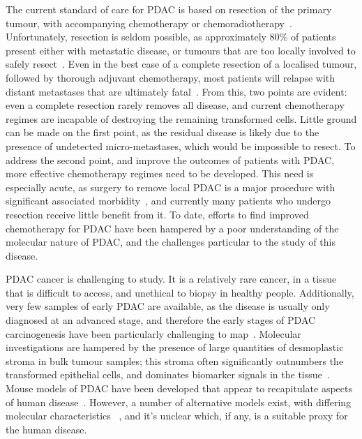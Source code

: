 \documentclass[thesis.tex]{subfiles}
\begin{document}
The current standard of care for \gls{PDAC} is based on resection of the primary tumour, with accompanying chemotherapy or chemoradiotherapy~\cite{Editors2015}.  Unfortunately, resection is seldom possible, as approximately $80\%$ of patients present either with metastatic disease, or tumours that are too locally involved to safely resect~\cite{Ryan2014}.  Even in the best case of a complete resection of a localised tumour, followed by thorough adjuvant chemotherapy, most patients will relapse with distant metastases that are ultimately fatal~\cite{Barugola2007}.  From this, two points are evident: even a complete resection rarely removes all disease, and current chemotherapy regimes are incapable of destroying the remaining transformed cells.  Little ground can be made on the first point, as the residual disease is likely due to the presence of undetected micro-metastases, which would be impossible to resect.  To address the second point, and improve the outcomes of patients with \gls{PDAC}, more effective chemotherapy regimes need to be developed.  This need is especially acute, as surgery to remove local \gls{PDAC} is a major procedure with significant associated morbidity~\cite{Ho2005}, and currently many patients who undergo resection receive little benefit from it.  To date, efforts to find improved chemotherapy for \gls{PDAC} have been hampered by a poor understanding of the molecular nature of \gls{PDAC}, and the challenges particular to the study of this disease.

\gls{PDAC} cancer is challenging to study.  It is a relatively rare cancer, in a tissue that is difficult to access, and unethical to biopsy in healthy people.  Additionally, very few samples of early \gls{PDAC} are available, as the disease is usually only diagnosed at an advanced stage, and therefore the early stages of \gls{PDAC} carcinogenesis have been particularly challenging to map~\cite{Hruban2000}.  Molecular investigations are hampered by the presence of large quantities of desmoplastic stroma in bulk tumour samples; this stroma often significantly outnumbers the transformed epithelial cells, and dominates biomarker signals in the tissue~\cite{Collisson2011}.  Mouse models of \gls{PDAC} have been developed that appear to recapitulate aspects of human disease~\cite{TODO}.  However, a number of alternative models exist, with differing molecular characteristics ~\cite{TODO}, and it's unclear which, if any, is a suitable proxy for the human disease.
\end{document}

